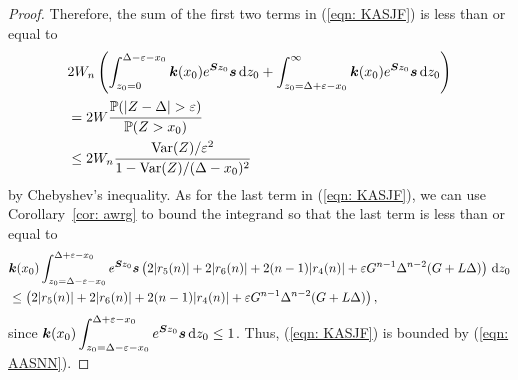 \begin{proof}
		Therefore, the sum of the first two terms in (\ref{eqn: KASJF}) is less than or equal to 
		\begin{align}
		&2W_n\left(\int_{z_0=0}^{\Delta-\varepsilon-x_0}\bs k(x_0)e^{\bs S z_0} \bs s \wrt z_0+\int_{z_0=\Delta+\varepsilon-x_0}^\infty \bs k(x_0)e^{\bs S z_0} \bs s \wrt z_0\right)\nonumber 
		\\\nonumber &= 2W \cfrac{\mathbb P(|Z-\Delta|> \varepsilon)}{\mathbb P(Z> x_0)}
		\\&\leq 2W_n\cfrac{\var(Z)/\varepsilon^2}{1-\var(Z)/(\Delta-x_0)^2}
		\end{align}
		by Chebyshev's inequality. As for the last term in (\ref{eqn: KASJF}), we can use Corollary~\ref{cor: awrg} to bound the integrand so that the last term is less than or equal to 
		\begin{align}
		\nonumber&\boldsymbol k(x_0) \int_{z_0=\Delta-\varepsilon-x_0}^{\Delta+\varepsilon-x_0} e^{\boldsymbol Sz_0}\boldsymbol s \left( 2|r_5(n)| + 2|r_6(n)| + 2(n-1)|r_4(n)| + \varepsilon G^{n-1}\Delta^{n-2}(G+L\Delta) \right) \, \mathrm{d} z_0
		\\&\leq  \left( 2|r_5(n)| + 2|r_6(n)| + 2(n-1)|r_4(n)| + \varepsilon G^{n-1}\Delta^{n-2}(G+L\Delta) \right),\label{eqn: AASNN}
	\end{align}
	since \(\displaystyle \boldsymbol k(x_0) \int_{z_0=\Delta-\varepsilon-x_0}^{\Delta+\varepsilon-x_0} e^{\boldsymbol Sz_0}\boldsymbol s\, \mathrm{d} z_0\leq 1\). Thus, (\ref{eqn: KASJF}) is bounded by (\ref{eqn: AASNN}).
\end{proof}

